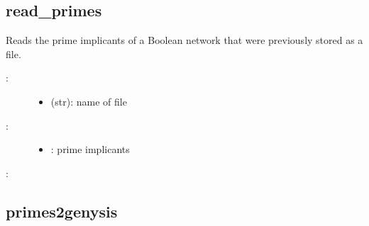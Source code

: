 \documentclass[letterpaper,10pt,english]{sphinxmanual}
\begin{document}
\subsection{read\_primes}
\label{\detokenize{FileExchange:id5}}\label{\detokenize{FileExchange:read-primes}}

\begin{fulllineitems}
\label{\detokenize{FileExchange:PyBoolNet.FileExchange.read_primes}}
Reads the prime implicants of a Boolean network that were previously stored as a  file.
\begin{description}
\item[{:}] \leavevmode\begin{itemize}
\item {} 
 (str): name of  file

\end{itemize}

\item[{:}] \leavevmode\begin{itemize}
\item {} 
: prime implicants

\end{itemize}

\end{description}

:

\begin{sphinxVerbatim}[commandchars=\\\{\}]
  
\end{sphinxVerbatim}

\end{fulllineitems}



\subsection{primes2genysis}
\label{\detokenize{FileExchange:id6}}\label{\detokenize{FileExchange:primes2genysis}}
\end{document}
